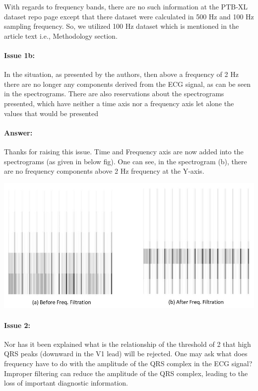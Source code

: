 \documentclass{article}
\begin{document}
With regards to frequency bands, there are no such information at the PTB-XL dataset repo page except that there dataset were calculated in 500 Hz and 100 Hz sampling frequency. So, we utilized 100 Hz dataset which is mentioned in the article text i.e., Methodology section. 

\paragraph{Issue 1b:}
\begin{displayquote}
In the situation, as presented by the authors, then above a frequency of 2 Hz there are no longer any components derived from the ECG signal, as can be seen in the spectrograms. There are also reservations about the spectrograms presented, which have neither a time axis nor a frequency axis let alone the values that would be presented
\end{displayquote}

\paragraph{Answer:}
Thanks for raising this issue. Time and Frequency axis are now added into the spectrograms (as given in below fig). One can see, in the spectrogram (b), there are no frequency components above 2 Hz frequency at the Y-axis. 

\includegraphics[scale=0.55]{before and after spectrogram.JPG}


\paragraph{Issue 2:}
\begin{displayquote}
Nor has it been explained what is the relationship of the threshold of 2 that high QRS peaks (downward in the V1 lead) will be rejected. One may ask what does frequency have to do with the amplitude of the QRS complex in the ECG signal? Improper filtering can reduce the amplitude of the QRS complex, leading to the loss of important diagnostic information.
\end{displayquote}
\end{document}
